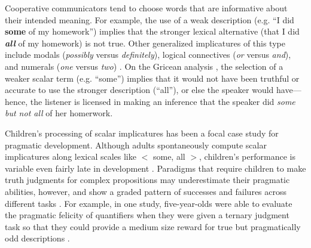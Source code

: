 \documentclass[10pt,letterpaper]{article}
\begin{document}
Cooperative communicators tend to choose words that are informative about their intended meaning. For example, the use of a weak description (e.g. ``I did \textbf{some} of my homework'') implies that the stronger lexical alternative (that I did \emph{\textbf{all}} of my homework) is not true. Other generalized implicatures of this type include modals (\emph{possibly} versus \emph{definitely}), logical connectives (\emph{or} versus \emph{and}), and numerals (\emph{one} versus \emph{two}) \citep{horn1972}.  On the Gricean analysis \citep{grice1975}, the selection of a weaker scalar term (e.g. ``some'') implies that it would not have been truthful or accurate to use the stronger description (``all''), or else the speaker would have---hence, the listener is licensed in making an inference that the speaker did \emph{some but not all} of her homerwork. 


Children's processing of scalar implicatures has been a focal case study for pragmatic development. Although adults spontaneously compute scalar implicatures along lexical scales like $<$ {\sc some, all} $>$, children's performance is variable even fairly late in development \citep{noveck2001}.  Paradigms that require children to make truth judgments for complex propositions may underestimate their pragmatic abilities, however, and show a graded pattern of successes and failures across different tasks \citep{guasti2005,papafragou2003, papafragou2004}. For example, in one study, five-year-olds were able to evaluate the pragmatic felicity of quantifiers when they were given a ternary judgment task so that they could provide a medium size reward for true but pragmatically odd descriptions \citep{katsos2011}.  
\end{document}
